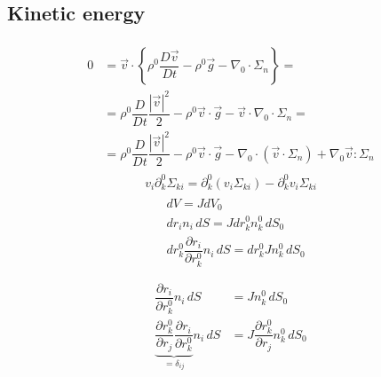 \documentclass[letterpaper,10pt,english]{jupyterBook}
\begin{document}
\subsection{Kinetic energy}
\label{\detokenize{ch/continuum/balance-reference-integral:kinetic-energy}}\label{\detokenize{ch/continuum/balance-reference-integral:continuum-governing-equations-reference-integral-kinetic-energy}}\begin{equation*}
\begin{split}\begin{aligned}
  0
  & = \vec{v} \cdot \left\{ \rho^0 \dfrac{D \vec{v}}{D t} - \rho^0 \vec{g} - \nabla_0 \cdot \mathbb{\Sigma}_n \right\} = \\
  & = \rho^0 \dfrac{D}{D t}\dfrac{|\vec{v}|^2}{2} - \rho^0 \vec{v} \cdot \vec{g} - \vec{v} \cdot \nabla_0 \cdot \mathbb{\Sigma}_n = \\
  & = \rho^0 \dfrac{D}{D t}\dfrac{|\vec{v}|^2}{2} - \rho^0 \vec{v} \cdot \vec{g} - \nabla_0 \cdot \left( \vec{v} \cdot  \mathbb{\Sigma}_n \right) + \nabla_0 \vec{v} :  \mathbb{\Sigma}_n 
\end{aligned}\end{split}
\end{equation*}\begin{equation*}
\begin{split}v_i \partial^0_k \Sigma_{ki} = \partial^0_k \left( v_i \Sigma_{ki} \right) - \partial^0_k v_i \Sigma_{ki}\end{split}
\end{equation*}\begin{equation*}
\begin{split}\begin{aligned}
 & d V = J d V_0 \\
 & dr_i n_i \, dS = J dr^0_{k} n^0_k \, dS_0 \\
 & dr^0_k \dfrac{\partial r_i}{\partial r^0_k} n_i \, dS = dr^0_{k} J n^0_k \, dS_0 \\
\end{aligned}\end{split}
\end{equation*}\begin{equation*}
\begin{split}\begin{aligned}
  \dfrac{\partial r_i}{\partial r^0_k} n_i \, dS & = J n^0_k \, dS_0 \\
  \underbrace{\dfrac{\partial r^0_k}{\partial r_j} \dfrac{\partial r_i}{\partial r^0_k}}_{=\delta_{ij}} n_i \, dS & = J \dfrac{\partial r^0_k}{\partial r_j} n^0_k \, dS_0 \\

\end{aligned}
\end{split}
\end{equation*}
\end{document}
